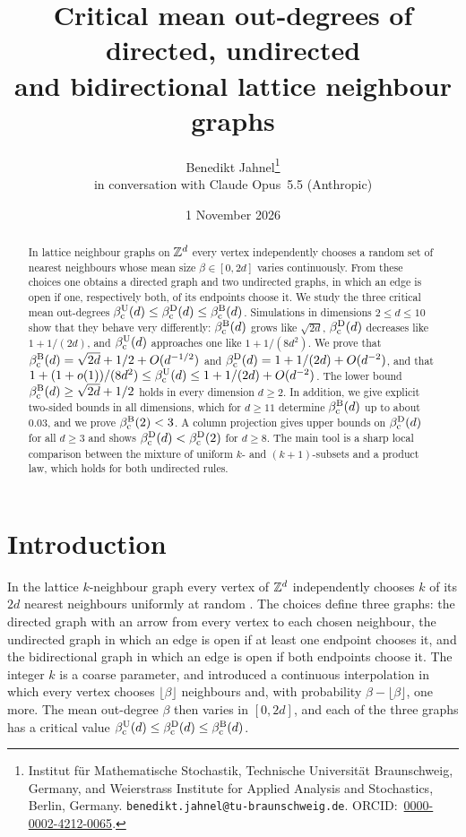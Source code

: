 \documentclass[11pt,letterpaper]{article}
\title{Critical mean out-degrees of directed, undirected\\ and bidirectional lattice neighbour graphs}
\author{Benedikt Jahnel\thanks{Institut f\"ur Mathematische Stochastik, Technische Universit\"at Braunschweig, Germany, and Weierstrass Institute for Applied Analysis and Stochastics, Berlin, Germany. \texttt{benedikt.jahnel@tu-braunschweig.de}. ORCID:~\mbox{\href{https://orcid.org/0000-0002-4212-0065}{0000-0002-4212-0065}}.}\\[0.4em]{\normalsize in conversation with Claude Opus~5.5 (Anthropic)}}
\date{1 November 2026}
\begin{document}
\maketitle
\thispagestyle{plain}

\begin{abstract}
In lattice neighbour graphs on $\mathbb Z^d$ every vertex independently chooses a random set of nearest neighbours whose mean size $\beta\in[0,2d]$ varies continuously. From these choices one obtains a directed graph and two undirected graphs, in which an edge is open if one, respectively both, of its endpoints choose it. We study the three critical mean out-degrees $\beta_{\mathrm c}^{\mathrm U}(d)\le\beta_{\mathrm c}^{\mathrm D}(d)\le\beta_{\mathrm c}^{\mathrm B}(d)$. Simulations in dimensions $2\le d\le10$ show that they behave very differently: $\beta_{\mathrm c}^{\mathrm B}(d)$ grows like $\sqrt{2d}$, $\beta_{\mathrm c}^{\mathrm D}(d)$ decreases like $1+1/(2d)$, and $\beta_{\mathrm c}^{\mathrm U}(d)$ approaches one like $1+1/(8d^2)$. We prove that $\beta_{\mathrm c}^{\mathrm B}(d)=\sqrt{2d}+1/2+O(d^{-1/2})$ and $\beta_{\mathrm c}^{\mathrm D}(d)=1+1/(2d)+O(d^{-2})$, and that $1+(1+o(1))/(8d^2)\le\beta_{\mathrm c}^{\mathrm U}(d)\le1+1/(2d)+O(d^{-2})$. The lower bound $\beta_{\mathrm c}^{\mathrm B}(d)\ge\sqrt{2d}+1/2$ holds in every dimension $d\ge2$. In addition, we give explicit two-sided bounds in all dimensions, which for $d\ge11$ determine $\beta_{\mathrm c}^{\mathrm B}(d)$ up to about $0.03$, and we prove $\beta_{\mathrm c}^{\mathrm B}(2)<3$. A column projection gives upper bounds on $\beta_{\mathrm c}^{\mathrm D}(d)$ for all $d\ge3$ and shows $\beta_{\mathrm c}^{\mathrm D}(d)<\beta_{\mathrm c}^{\mathrm D}(2)$ for $d\ge8$. The main tool is a sharp local comparison between the mixture of uniform $k$- and $(k+1)$-subsets and a product law, which holds for both undirected rules.
\end{abstract}

\section{Introduction}\label{sec:intro}

In the lattice $k$-neighbour graph every vertex of $\mathbb Z^d$ independently chooses $k$ of its $2d$ nearest neighbours uniformly at random \cite{JKLT25}. The choices define three graphs: the directed graph with an arrow from every vertex to each chosen neighbour, the undirected graph in which an edge is open if at least one endpoint chooses it, and the bidirectional graph in which an edge is open if both endpoints choose it. The integer $k$ is a coarse parameter, and \cite{CHJK26,BJKLRT25} introduced a continuous interpolation in which every vertex chooses $\lfloor\beta\rfloor$ neighbours and, with probability $\beta-\lfloor\beta\rfloor$, one more. The mean out-degree $\beta$ then varies in $[0,2d]$, and each of the three graphs has a critical value $\beta_{\mathrm c}^{\mathrm U}(d)\le\beta_{\mathrm c}^{\mathrm D}(d)\le\beta_{\mathrm c}^{\mathrm B}(d)$.
\end{document}
